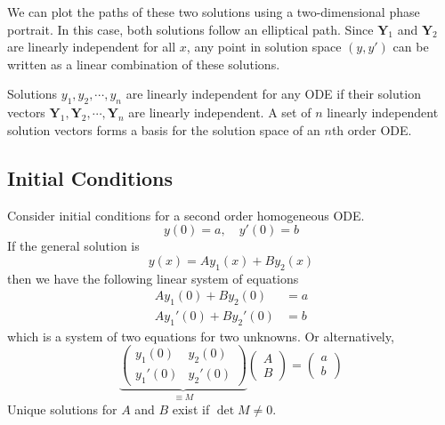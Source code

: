\documentclass{article}
\begin{document}
We can plot the paths of these two solutions using a two-dimensional phase portrait. In this case, both solutions follow an elliptical path. Since $\bm Y_1$ and $\bm Y_2$ are linearly independent for all $x$, any point in solution space $(y, y')$ can be written as a linear combination of these solutions.

Solutions $y_1, y_2, \cdots, y_n$ are linearly independent for any ODE if their solution vectors $\bm Y_1, \bm Y_2, \cdots, \bm Y_n$ are linearly independent. A set of $n$ linearly independent solution vectors forms a basis for the solution space of an $n$th order ODE.

\subsection{Initial Conditions}
Consider initial conditions for a second order homogeneous ODE.
\[ y(0) = a,\quad y'(0) = b \]
If the general solution is
\[ y(x) = Ay_1(x) + By_2(x) \]
then we have the following linear system of equations
\begin{align*}
	Ay_1(0) + By_2(0)   & = a \\
	Ay_1'(0) + By_2'(0) & = b
\end{align*}
which is a system of two equations for two unknowns. Or alternatively,
\[
	\underbrace{\begin{pmatrix}
			y_1(0)  & y_2(0)  \\
			y_1'(0) & y_2'(0)
		\end{pmatrix}}_{\equiv M}
	\begin{pmatrix}
		A \\ B
	\end{pmatrix}
	=
	\begin{pmatrix}
		a \\b
	\end{pmatrix}
\]
Unique solutions for $A$ and $B$ exist if $\det M \neq 0$.
\end{document}

